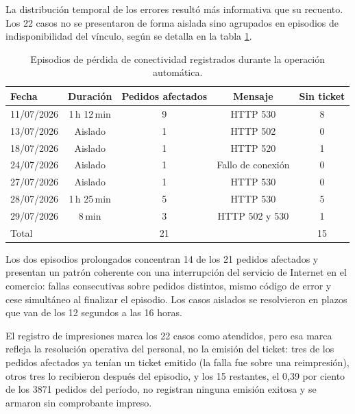 La distribución temporal de los errores resultó más informativa que su recuento. Los 22 casos no se presentaron de forma aislada sino agrupados en episodios de indisponibilidad del vínculo, según se detalla en la tabla \ref{tab:episodios}.

\begin{table}[H]
    \centering
    \caption{Episodios de pérdida de conectividad registrados durante la operación automática.}
    \label{tab:episodios}
    \begin{tabular}{l c c c c}
        \toprule
        \textbf{Fecha} & \textbf{Duración} & \textbf{Pedidos afectados} & \textbf{Mensaje}  & \textbf{Sin ticket} \\
        \midrule
        11/07/2026     & 1\,h 12\,min      & 9                          & HTTP 530          & 8                   \\
        13/07/2026     & Aislado           & 1                          & HTTP 502          & 0                   \\
        18/07/2026     & Aislado           & 1                          & HTTP 520          & 1                   \\
        24/07/2026     & Aislado           & 1                          & Fallo de conexión & 0                   \\
        27/07/2026     & Aislado           & 1                          & HTTP 530          & 0                   \\
        28/07/2026     & 1\,h 25\,min      & 5                          & HTTP 530          & 5                   \\
        29/07/2026     & 8\,min            & 3                          & HTTP 502 y 530    & 1                   \\
        \midrule
        Total          &                   & 21                         &                   & 15                  \\
        \bottomrule
    \end{tabular}
\end{table}

Los dos episodios prolongados concentran 14 de los 21 pedidos afectados y presentan un patrón coherente con una interrupción del servicio de Internet en el comercio: fallas consecutivas sobre pedidos distintos, mismo código de error y cese simultáneo al finalizar el episodio. Los casos aislados se resolvieron en plazos que van de los 12 segundos a las 16 horas.

El registro de impresiones marca los 22 casos como atendidos, pero esa marca refleja la resolución operativa del personal, no la emisión del ticket: tres de los pedidos afectados ya tenían un ticket emitido (la falla fue sobre una reimpresión), otros tres lo recibieron después del episodio, y los 15 restantes, el 0,39 por ciento de los 3871 pedidos del período, no registran ninguna emisión exitosa y se armaron sin comprobante impreso.


